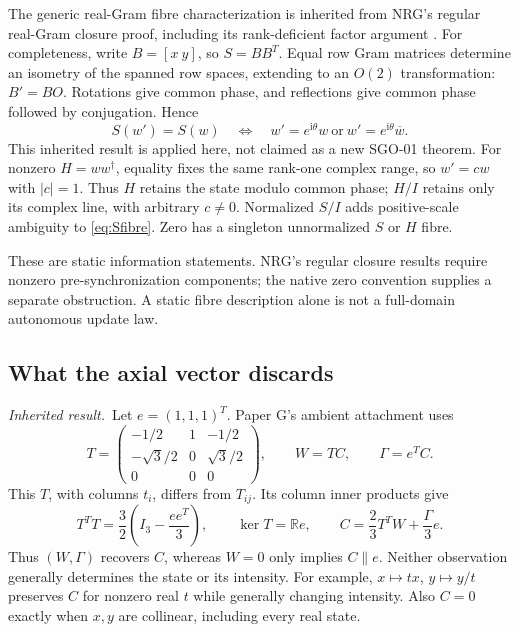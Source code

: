 \documentclass[11pt,a4paper]{article}
\newcommand{\R}{\mathbb R}\newcommand{\C}{\mathbb C}
\newcommand{\ii}{\mathrm i}\newcommand{\tr}{\operatorname{tr}}
\newcommand{\inherited}{\textit{Inherited result.}}
\begin{document}
The generic real-Gram fibre characterization is inherited from NRG's regular real-Gram closure proof, including its rank-deficient factor argument \cite{nrg}. For completeness, write $B=[x\ y]$, so $S=BB^T$. Equal row Gram matrices determine an isometry of the spanned row spaces, extending to an $O(2)$ transformation: $B'=BO$. Rotations give common phase, and reflections give common phase followed by conjugation. Hence
\begin{equation}
S(w')=S(w)\quad\Longleftrightarrow\quad
w'=e^{\ii\theta}w\ \text{or}\ w'=e^{\ii\theta}\overline w.
\label{eq:Sfibre}
\end{equation}
This inherited result is applied here, not claimed as a new SGO-01 theorem. For nonzero $H=ww^\dagger$, equality fixes the same rank-one complex range, so $w'=cw$ with $|c|=1$. Thus $H$ retains the state modulo common phase; $H/I$ retains only its complex line, with arbitrary $c\ne0$. Normalized $S/I$ adds positive-scale ambiguity to \eqref{eq:Sfibre}. Zero has a singleton unnormalized $S$ or $H$ fibre.

These are static information statements. NRG's regular closure results require nonzero pre-synchronization components; the native zero convention supplies a separate obstruction. A static fibre description alone is not a full-domain autonomous update law.

\subsection{What the axial vector discards}
\inherited\ Let $e=(1,1,1)^T$. Paper G's ambient attachment uses
\begin{equation}
T=\begin{pmatrix}-1/2&1&-1/2\\-\sqrt3/2&0&\sqrt3/2\\0&0&0\end{pmatrix},
\qquad W=TC,\qquad\Gamma=e^TC.\label{eq:attachment}
\end{equation}
This $T$, with columns $t_i$, differs from $T_{ij}$. Its column inner products give
\begin{equation}
T^TT=\frac32\left(I_3-\frac{ee^T}{3}\right),\qquad
\ker T=\R e,\qquad C=\frac23T^TW+\frac\Gamma3e.\label{eq:recoveryC}
\end{equation}
Thus $(W,\Gamma)$ recovers $C$, whereas $W=0$ only implies $C\parallel e$. Neither observation generally determines the state or its intensity. For example, $x\mapsto tx$, $y\mapsto y/t$ preserves $C$ for nonzero real $t$ while generally changing intensity. Also $C=0$ exactly when $x,y$ are collinear, including every real state.
\end{document}
